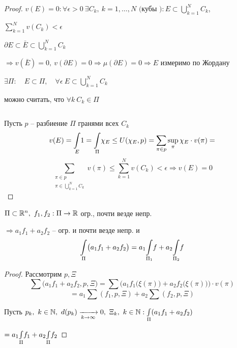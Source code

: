     \begin{proof}
        $v(E) = 0 : \forall \epsilon > 0 \ \exists C_k, \ k = 1, \dots, N \text{ (кубы )} : E \subset \bigcup_{k=1}^N C_k$,
        \par $\sum_{k=1}^N v(C_k) < \epsilon$
        \par $\partial E \subset \bar E \subset \bigcup_{k=1}^N C_k$
        \par $\Rightarrow v(\bar E) = 0, \ v(\partial E) = 0 \Rightarrow \mu(\partial E) = 0 \Rightarrow E$ измеримо по Жордану
        \par $\exists \Pi: \quad E \subset \Pi, \quad \forall \epsilon \ E \subset \bigcup_{k=1}^N C_k$
        \par \quad можно считать, что $\forall k \ C_k \in \Pi$
        \par $ $
        \par Пусть $p$ -- разбиение $\Pi$ гранями всех $C_k$
        \[
            v(E) = \underset{E}{\int} 1 = \underset{\Pi}{\int} \chi_E \le U(\chi_E, p) = \sum_{\pi \in p} \sup_\pi \chi_E \cdot v(\pi) =  
        \] 
        \[
            \sum_{\begin{aligned}
                \pi \in p \\
                \pi \in \bigcup_{k = 1}^N C_k
            \end{aligned}} v(\pi) \le \sum_{k=1}^N v(C_k) < \epsilon \Rightarrow v(E) = 0
        \]
    \end{proof}

    \begin{lemma}
        $\Pi \subset \mathbb{R}^n , \ f_1, f_2 : \Pi \rightarrow \mathbb{R}$ огр., почти везде непр.
        \par $\Rightarrow a_1f_1 + a_2f_2$ -- огр. и почти везде непр. и
        \[
            \underset{\Pi}{\int} \big(a_1f_1 + a_2f_2\big) = a_1 \underset{\Pi_1}{\int} f + a_2 \underset{\Pi_2}{\int} f    
        \]
    \end{lemma}
    \begin{proof}
        Рассмотрим $p, \Xi$
        \[
            \sum\big(a_1f_1 + a_2f_2, p, \Xi\big) = \sum\Big(a_1f_1\big(\xi(\pi)\big) + a_2f_2\big(\xi(\pi)\big)\Big) \cdot v(\pi)     
        \]
        \[
            = a_1 \sum(f_1, p, \Xi) + a_2\sum(f_2, p, \Xi)    
        \]
        \par Пусть $p_k, \ k \in \mathbb{N}, \ d(p_k) \xrightarrow[k \rightarrow \infty]{} 0, \ \Xi_k, \ k \in \mathbb{N} : \underset{\Pi}{\int}(a_1f_1 + a_2f_2)$
        \par $= a_1 \underset{\Pi}{\int} f_1 + a_2\underset{\Pi}{\int} f_2$
    \end{proof}

